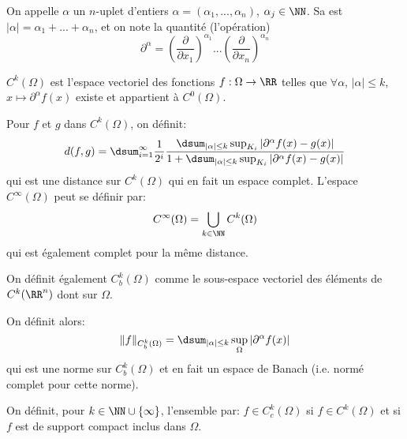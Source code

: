 \medskip
\begin{definition}
On appelle  $\alpha$ un $n$-uplet d'entiers
$\alpha=(\alpha_1, ..., \alpha_n)$, $\alpha_j\in\NN$.
Sa  est $|\alpha|=\alpha_1+ ... + \alpha_n$,
et on note  la quantité (l'opération)
\begin{equation}\partial^\alpha=\left(\dfrac{\partial}{\partial x_1}\right)^{\alpha_1}...\left(\dfrac{\partial}{\partial x_n}\right)^{\alpha_n}\end{equation}
\end{definition}

\medskip{}
$C^k(\Omega)$ est l'espace vectoriel des fonctions $f: \Omega \to \RR$ telles que
$\forall \alpha$, $|\alpha|\le k$, $x\mapsto \partial^\alpha f(x)$ existe et appartient
à $C^0(\Omega)$.

Pour $f$ et $g$ dans $C^k(\Omega)$, on définit:
\begin{equation}
d(f,g)=\dsum_{i=1}^\infty \dfrac1{2^i}\dfrac{\dsum_{|\alpha|\le k} \sup_{K_i}|\partial^\alpha f(x)-g(x)|}{%
1+\dsum_{|\alpha|\le k} \sup_{K_i}|\partial^\alpha f(x)-g(x)|}
\end{equation}
qui est une distance sur $C^k(\Omega)$ qui en fait un espace complet. L'espace $C^\infty(\Omega)$ peut se définir par: \begin{equation} C^\infty(\Omega)=\bigcup\limits_{k\in\NN}C^k(\Omega)\end{equation}
qui est également complet pour la même distance.

\bigskip{}
On définit également $C^k_b(\Omega)$ comme le sous-espace vectoriel des éléments
de $C^k(\RR^n)$ dont 
sur $\Omega$.

On définit alors:
\begin{equation}
\|f\|_{C^k_b(\Omega)}=\dsum_{|\alpha|\le k} \sup_{\Omega} |\partial^\alpha f(x)|
\end{equation}
qui est une norme sur $C^k_b(\Omega)$ et en fait un espace de Banach (i.e. normé
complet pour cette norme).

\medskip
\begin{definition}\label{Def-Cc}
On définit, pour $k\in\NN\cup\{\infty\}$, l'ensemble  par:
$f\in C_c^k(\Omega)$ si $f\in C^k(\Omega)$ et si $f$ est de support compact inclus dans $\Omega$.
\end{definition}

